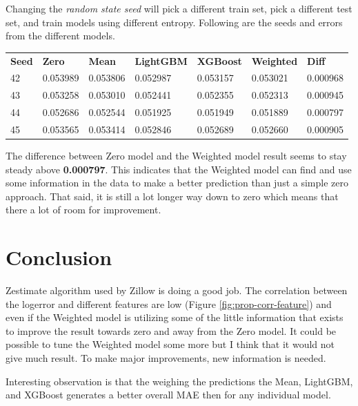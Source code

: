 \documentclass[a4paper]{article}
\begin{document}
Changing the \textit{random state seed} will pick a different train set, pick a different test set, and train models
using different entropy. Following are the seeds and errors from the different models.
\begin{center}
\begin{tabular}{ l l l l l l l }
    \textbf{Seed} & \textbf{Zero} & \textbf{Mean} & \textbf{LightGBM} & \textbf{XGBoost} & \textbf{Weighted} & \textbf{Diff} \\
    42 & 0.053989 & 0.053806 & 0.052987 & 0.053157 & 0.053021 & 0.000968 \\
    43 & 0.053258 & 0.053010 & 0.052441 & 0.052355 & 0.052313 & 0.000945 \\
    44 & 0.052686 & 0.052544 & 0.051925 & 0.051949 & 0.051889 & 0.000797 \\
    45 & 0.053565 & 0.053414 & 0.052846 & 0.052689 & 0.052660 & 0.000905 \\
\end{tabular}
\end{center}
The difference between Zero model and the Weighted model result seems to stay steady above
\textbf{0.000797}. This indicates that the Weighted model can find and use some information in the data to
make a better prediction than just a simple zero approach. That said, it is still a lot longer way down
to zero which means that there a lot of room for improvement.

\section{Conclusion}
Zestimate algorithm used by Zillow is doing a good job. The correlation between the logerror and
different features are low (Figure \ref{fig:prop-corr-feature}) and even if the Weighted model is utilizing
some of the little information that exists to improve the result towards zero and away from the Zero model.
It could be possible to tune the Weighted model some more but I think that it would not give much result.
To make major improvements, new information is needed.

Interesting observation is that the weighing the predictions the Mean, LightGBM, and XGBoost generates a
better overall MAE then for any individual model.


\end{document}
